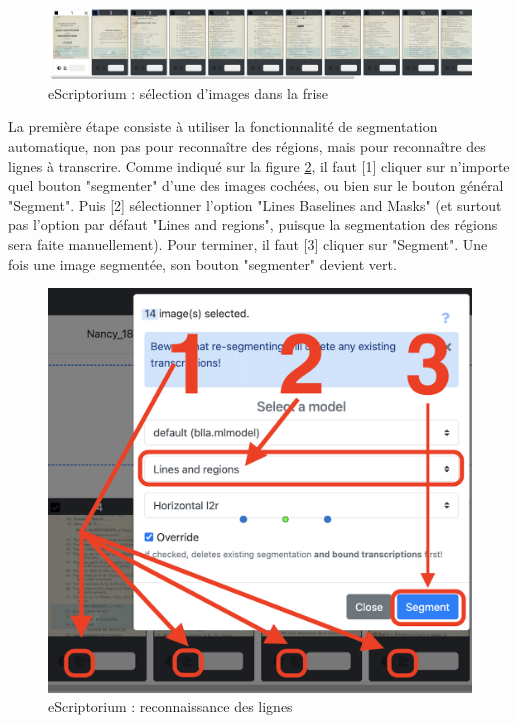 \documentclass[a4paper,12pt,twoside]{book}
\begin{document}
\begin{figure}[ht]
	\centering
	\includegraphics[scale=0.3]{cocher_eScriptorium.png}		
	\caption{eScriptorium : sélection d'images dans la frise}
	\label{cochees}
\end{figure}

La première étape consiste à utiliser la fonctionnalité de segmentation automatique, non pas pour reconnaître des régions, mais pour reconnaître des lignes à transcrire. Comme indiqué sur la figure \ref{lignes}, il faut [1] cliquer sur n'importe quel bouton "segmenter" d'une des images cochées, ou bien sur le bouton général "Segment". Puis [2] sélectionner l'option "Lines Baselines and Masks" (et surtout pas l'option par défaut "Lines and regions", puisque la segmentation des régions sera faite manuellement). Pour terminer, il faut [3] cliquer sur "Segment". Une fois une image segmentée, son bouton "segmenter" devient vert.
\begin{figure}[ht]
	\centering
	\includegraphics[scale=0.3]{lines_eScriptorium.png}		
	\caption{eScriptorium : reconnaissance des lignes}
	\label{lignes}
\end{figure}
\end{document}
